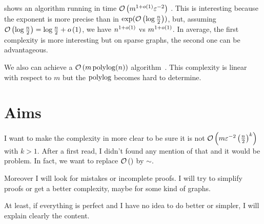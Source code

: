 \bigskip

\cite{kelner2014almost} shows an algorithm running in time $\mathcal{O}\left(m^{1+o\left(1\right)} \varepsilon^{-2}\right)$ . This is interesting because the exponent is more precise than in $\exp(\mathcal{O}\left(\log \frac{n}{2}\right))$, but, assuming $\mathcal{O}\left(\log \frac{n}{2}\right) = \log\frac{n}{2}+o\left(1\right)$, we have $n^{1+o\left(1\right)}$ vs $m^{1+o\left(1\right)}$. In average, the first complexity is more interesting but on sparse graphs, the second one can be advantageous.

\bigskip

We also can achieve a $\mathcal{O}\left(m \operatorname{polylog}(n)\right)$ algorithm~\cite{peng2014note}. This complexity is linear with respect to $m$ but the $\operatorname{polylog}$ becomes hard to determine.

\section{Aims}

I want to make the complexity in \cite{sherman2013nearly} more clear to be sure it is not $\mathcal{O}\left(m\varepsilon^{-2}\left(\frac{n}{2}\right)^k\right)$ with $k>1$. After a first read, I didn't found any mention of that and it would be problem. In fact, we want to replace $\mathcal{O}\left(\right)$ by $\sim$.

Moreover I will look for mistakes or incomplete proofs. I will try to simplify proofs or get a better complexity, maybe for some kind of graphs.

At least, if everything is perfect and I have no idea to do better or simpler, I will explain clearly the content.








